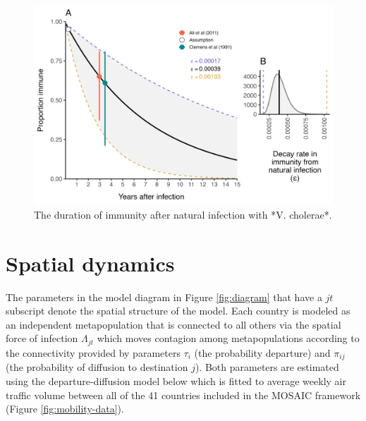 \documentclass[
]{book}
\begin{document}
\begin{figure}

{\centering \includegraphics[width=1\linewidth]{figures/immune_decay} 

}

\caption{The duration of immunity after natural infection with *V. cholerae*.}\label{fig:immune-decay}
\end{figure}

\section{Spatial dynamics}\label{spatial-dynamics}

The parameters in the model diagram in Figure \ref{fig:diagram} that have a \(jt\) subscript denote the spatial structure of the model. Each country is modeled as an independent metapopulation that is connected to all others via the spatial force of infection \(\Lambda_{jt}\) which moves contagion among metapopulations according to the connectivity provided by parameters \(\tau_i\) (the probability departure) and \(\pi_{ij}\) (the probability of diffusion to destination \(j\)). Both parameters are estimated using the departure-diffusion model below which is fitted to average weekly air traffic volume between all of the 41 countries included in the MOSAIC framework (Figure \ref{fig:mobility-data}).
\end{document}
